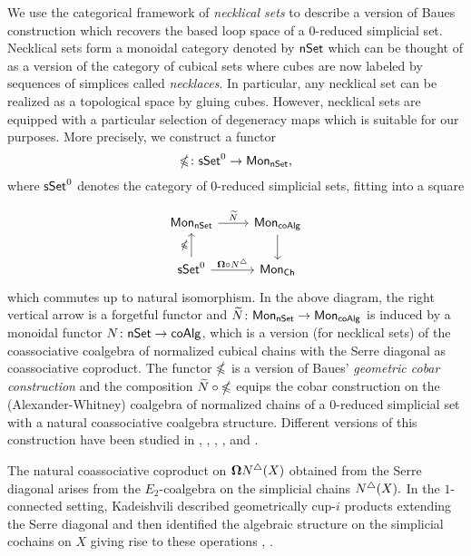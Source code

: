 We use the categorical framework of \textit{necklical sets} to describe a version of Baues construction which recovers the based loop space of a $0$-reduced simplicial set. Necklical sets form a monoidal category denoted by $\mathsf{nSet}$ which can be thought of as a version of the category of cubical sets where cubes are now labeled by sequences of simplices called \textit{necklaces}. In particular, any necklical set can be realized as a topological space by gluing cubes. However, necklical sets are equipped with a particular selection of degeneracy maps which is suitable for our purposes.  More precisely, we construct a functor $$\mathbb{\Omega} \colon \mathsf{sSet}^0 \to \mathsf{Mon}_{\mathsf{nSet}},$$ where $\mathsf{sSet}^0$ denotes the category of $0$-reduced simplicial sets, fitting into a square

\begin{equation*}
\begin{tikzcd}
\Mon_{\nSet} \arrow[r, "\widetilde{N}"] & \Mon_{\coAlg} \arrow[d] \\
\sSet^0 \arrow[r, "\cobar \circ \chains"] \arrow[u, "\gcobar"] & \Mon_{\Ch}
\end{tikzcd}
\end{equation*}
which commutes up to natural isomorphism. In the above diagram, the right vertical arrow is a forgetful functor and $\widetilde{N} \colon \mathsf{Mon}_{\mathsf{nSet}} \to \mathsf{Mon}_{\mathsf{coAlg}}$ is induced by a monoidal functor $N \colon \mathsf{nSet} \to \mathsf{coAlg}$, which is a version (for necklical sets) of the coassociative coalgebra of normalized cubical chains with the Serre diagonal as coassociative coproduct. The functor $\mathbb{\Omega}$ is a version of Baues' \textit{geometric cobar construction} and the composition $\widetilde{N} \circ \mathbb{\Omega}$ equips the cobar construction on the (Alexander-Whitney) coalgebra of normalized chains of a $0$-reduced simplicial set with a natural coassociative coalgebra structure. Different versions of this construction have been studied in \cite{Cordier}, \cite{Dugger, Spivak}, \cite{Kaufmann, Galvez, Tonks}, \cite{Rivera-Zeinalian}, and \cite{Berger thesis}.

The natural coassociative coproduct on $\mathbf{\Omega} N^{\triangle} (X)$ obtained from the Serre diagonal arises from the $E_2$-coalgebra on the simplicial chains $N^{\triangle}(X).$ In the $1$-connected setting, Kadeishvili described geometrically cup-$i$ products extending the Serre diagonal and then identified the algebraic structure on the simplicial cochains on $X$ giving rise to these operations \cite{Kadeishvili99coproducts},  \cite{Pilarczyk2016cubical}.

